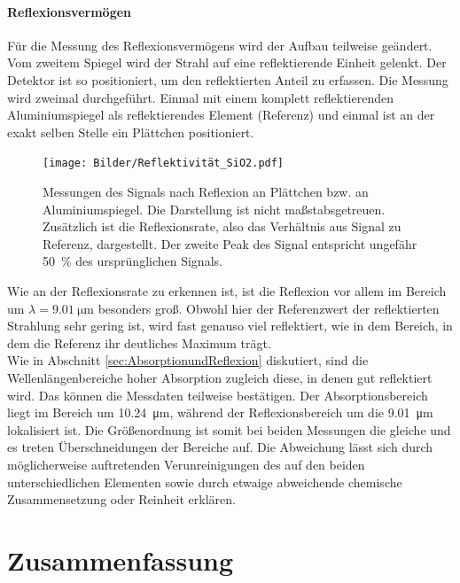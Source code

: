 \documentclass[a4paper,twoside,final]{article}
\begin{document}
\paragraph{Reflexionsvermögen}
Für die Messung des Reflexionsvermögens wird der Aufbau teilweise geändert. Vom zweitem Spiegel wird der Strahl auf eine reflektierende Einheit gelenkt. Der Detektor ist so positioniert, um den reflektierten Anteil zu erfassen. Die Messung wird zweimal durchgeführt. Einmal mit einem komplett reflektierenden Aluminiumspiegel als reflektierendes Element (Referenz) und einmal ist an der exakt selben Stelle ein  Plättchen positioniert.
\begin{figure}[htp]
  \centering
    \texttt{[image: Bilder/Reflektivität\_SiO2.pdf]}
    \caption{Messungen des Signals nach Reflexion an  Plättchen bzw. an Aluminiumspiegel. Die Darstellung ist nicht maßstabsgetreuen. Zusätzlich ist die Reflexionsrate, also das Verhältnis aus Signal zu Referenz, dargestellt. Der zweite Peak des  Signal entspricht ungefähr \SI{50}{\percent} des ursprünglichen Signals. }
\end{figure}
\FloatBarrier
Wie an der Reflexionsrate zu erkennen ist, ist die Reflexion vor allem im Bereich um $\lambda = \SI{9.01}{\micro\meter}$ besonders groß. Obwohl hier der Referenzwert der reflektierten Strahlung sehr gering ist, wird fast genauso viel reflektiert, wie in dem Bereich, in dem die Referenz ihr deutliches Maximum trägt.\\

Wie in Abschnitt \ref{sec:AbsorptionundReflexion} diskutiert, sind die Wellenlängenbereiche hoher Absorption zugleich diese, in denen gut reflektiert wird. Das können die Messdaten teilweise bestätigen. Der Absorptionsbereich liegt im Bereich um \SI{10.24}{\micro\meter}, während der Reflexionsbereich um die \SI{9.01}{\micro\meter} lokalisiert ist. Die Größenordnung ist somit bei beiden Messungen die gleiche und es treten Überschneidungen der Bereiche auf. Die Abweichung lässt sich durch möglicherweise auftretenden Verunreinigungen des  auf den beiden unterschiedlichen Elementen sowie durch etwaige abweichende chemische Zusammensetzung oder Reinheit erklären.



\newpage
\section{Zusammenfassung}



{}

\end{document}
